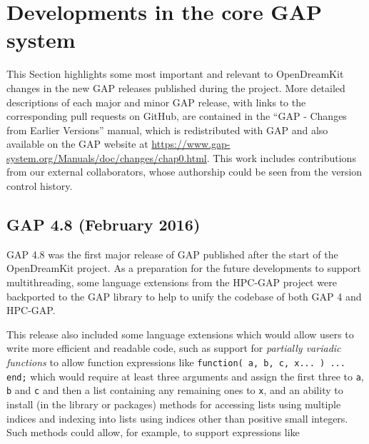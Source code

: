 \documentclass{deliverablereport}
\author{Author names}
\begin{document}
\maketitle
\githubissuedescription



\section{Developments in the core GAP system}

This Section highlights some most important and relevant to
OpenDreamKit changes in the new GAP releases published during the
project. More detailed descriptions of each major and minor
GAP release, with links to the corresponding pull requests on GitHub,
are contained in the ``GAP - Changes from Earlier Versions''
manual, which is redistributed with GAP and also available on the GAP
website at \url{https://www.gap-system.org/Manuals/doc/changes/chap0.html}.
This work includes contributions from our external collaborators, whose
authorship could be seen from the version control history.

\subsection{GAP 4.8 (February 2016)}

GAP 4.8 was the first major release of GAP published
after the start of the OpenDreamKit project.
As a preparation for the future developments to support multithreading, 
some language extensions from the HPC-GAP project were backported to the 
GAP library to help to unify the codebase of both GAP 4 and HPC-GAP. 

This release also included some language extensions which would allow users to write
more efficient and readable code, such as support for \emph{partially variadic functions}
to allow function expressions like
\verb|function( a, b, c, x... ) ... end;|
which would require at least three arguments and assign the first 
three to \verb|a|, \verb|b| and \verb|c| and then a list containing 
any remaining ones to \verb|x|, and an ability to install (in the library 
or packages) methods for accessing lists using multiple indices 
and indexing into lists using indices other than positive small integers. 
Such methods could allow, for example, to support expressions like
\end{document}
